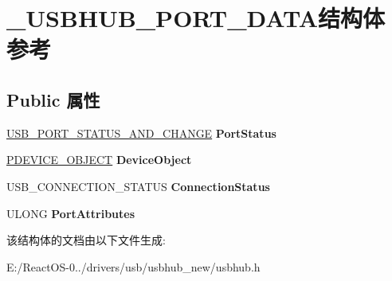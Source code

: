 \hypertarget{struct___u_s_b_h_u_b___p_o_r_t___d_a_t_a}{}\section{\+\_\+\+U\+S\+B\+H\+U\+B\+\_\+\+P\+O\+R\+T\+\_\+\+D\+A\+T\+A结构体 参考}
\label{struct___u_s_b_h_u_b___p_o_r_t___d_a_t_a}
\subsection*{Public 属性}
\begin{DoxyCompactItemize}
\item 
\mbox{\label{struct___u_s_b_h_u_b___p_o_r_t___d_a_t_a_a1cdea53a0fb3c80681bd362315adc771}} 
\hyperlink{union___u_s_b___p_o_r_t___s_t_a_t_u_s___a_n_d___c_h_a_n_g_e}{U\+S\+B\+\_\+\+P\+O\+R\+T\+\_\+\+S\+T\+A\+T\+U\+S\+\_\+\+A\+N\+D\+\_\+\+C\+H\+A\+N\+GE} {\bfseries Port\+Status}
\item 
\mbox{\label{struct___u_s_b_h_u_b___p_o_r_t___d_a_t_a_a4f0e5ac16ceb7a8c6a77c217efdb6185}} 
\hyperlink{struct___d_e_v_i_c_e___o_b_j_e_c_t}{P\+D\+E\+V\+I\+C\+E\+\_\+\+O\+B\+J\+E\+CT} {\bfseries Device\+Object}
\item 
\mbox{\label{struct___u_s_b_h_u_b___p_o_r_t___d_a_t_a_a187148e8f291cd1dfa8061aca0294b1d}} 
U\+S\+B\+\_\+\+C\+O\+N\+N\+E\+C\+T\+I\+O\+N\+\_\+\+S\+T\+A\+T\+US {\bfseries Connection\+Status}
\item 
\mbox{\label{struct___u_s_b_h_u_b___p_o_r_t___d_a_t_a_a1dab233aee37b0840e27133ad05c59eb}} 
U\+L\+O\+NG {\bfseries Port\+Attributes}
\end{DoxyCompactItemize}


该结构体的文档由以下文件生成\+:\begin{DoxyCompactItemize}
\item 
E\+:/\+React\+O\+S-\/0../drivers/usb/usbhub\+\_\+new/usbhub.\+h\end{DoxyCompactItemize}
